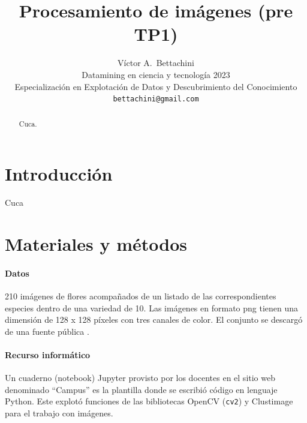\documentclass{article}
\title{Procesamiento de imágenes (pre TP1)}
\author{
  Víctor A.~Bettachini\\ %
  Datamining en ciencia y tecnología 2023\\
  Especialización en Explotación de Datos y Descubrimiento del Conocimiento\\
  \texttt{bettachini@gmail.com}
}
\begin{document}
\maketitle


\begin{abstract}
Cuca.
\end{abstract}




\section{Introducción}
Cuca


\section{Materiales y métodos}

\paragraph{Datos}
210 imágenes de flores acompañados de un listado de las correspondientes especies dentro de una variedad de 10.
Las imágenes en formato png tienen una dimensión de 128 x 128 píxeles con tres canales de color.
El conjunto se descargó de una fuente pública \cite{belitskaya_flower_2020}.


\paragraph{Recurso informático} 
Un cuaderno (notebook) Jupyter provisto por los docentes en el sitio web denominado ``Campus'' \cite{kamienkowski_curso_2023} es la plantilla donde se escribió código en lenguaje Python.
Este explotó funciones de las bibliotecas OpenCV (\verb'cv2') y Clustimage para el trabajo con imágenes.
\end{document}
